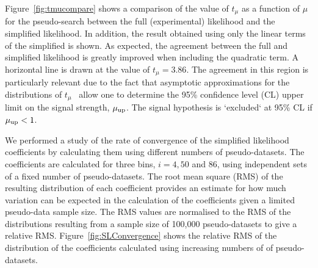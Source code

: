\documentclass[11pt]{article}
\begin{document}
Figure~\ref{fig:tmucompare} shows a comparison of the value of $t_{\mu}$ as a function of $\mu$ for the pseudo-search between the full (experimental)
likelihood and the simplified likelihood. In addition, the result obtained using only the linear terms of the simplified is shown. As expected, the
agreement between the full and simplified likelihood is greatly improved when including the quadratic term. A horizontal line is drawn at the value of
$t_{\mu}= 3.86$. The agreement in this region is particularly relevant due to the fact that asymptotic approximations for the distributions of $t_{\mu}$~\cite{Cowan:2010js} allow one to determine the 95\% confidence level (CL) upper limit on the signal strength, $\mu_{\rm{up}}$.
The signal hypothesis is `excluded` at 95\% CL if $\mu_{\rm{up}} < 1$.

We performed a study of the rate of convergence of the simplified likelihood coefficients by calculating them using different numbers of pseudo-datasets. 
The coefficients are calculated for three bins, $i=4,50$ and $86$, using independent sets of a fixed number of pseudo-datasets. The root mean square (RMS) 
of the resulting distribution of each coefficient provides an estimate for how much variation can be expected in the calculation 
of the coefficients given a limited pseudo-data sample size. The RMS values are normalised to the RMS of the distributions resulting from a sample size of 
100,000 pseudo-datasets to give a relative RMS. Figure~\ref{fig:SLConvergence} shows the relative RMS of the distribution of the 
coefficients calculated using increasing numbers of of pseudo-datasets. 
\end{document}
